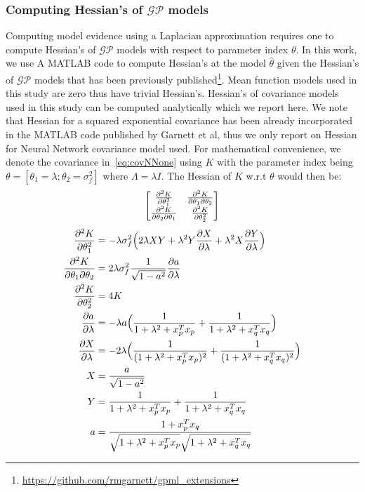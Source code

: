 \subsubsection{Computing Hessian's of $\mathcal{GP}$ models}
Computing model evidence using a Laplacian approximation requires one to compute Hessian's of $\mathcal{GP}$ models with respect to parameter index $\theta$. 
In this work, we use A MATLAB code to compute Hessian's at the model $\hat{\theta}$ given the Hessian's of $\mathcal{GP}$ models that has been previously published\footnote{\url{https://github.com/rmgarnett/gpml_extensions}}. Mean function models used in this study are zero thus have trivial Hessian's. Hessian's of  covariance models used in this study can be computed analytically which we report here. We note that Hessian for a squared exponential covariance has been already incorporated in the MATLAB code published by Garnett et al, thus we only report on Hessian for Neural Network covariance model used. For mathematical convenience, we denote the covariance in~\cref{eq:covNNone} using $K$ with the parameter index being \(\theta=[\theta_1=\lambda ; \theta_2=\sigma_f^{2} ]\) where \( \Lambda=\lambda I\). The Hessian of $K$ w.r.t $\theta$ would then be:
\[
\begin{bmatrix} 
\pdv[2]{K}{\theta_1} & \pdv{K}{\theta_1}{\theta_2} \\
\pdv{K}{\theta_2}{\theta_1} & \pdv[2]{K}{\theta_2} 
\end{bmatrix}
\]
\begin{align*}
    \pdv[2]{K}{\theta_1} & = -\lambda \sigma_{f}^{2}\Big(2\lambda XY + \lambda^2 Y\pdv{X}{\lambda} + \lambda^2 X\pdv{Y}{\lambda} \Big) \\
    \pdv{K}{\theta_1}{\theta_2} & = 2\lambda \sigma_{f}^{2}\frac{1}{\sqrt{1-a^2}}\pdv{a}{\lambda} \\
    \pdv[2]{K}{\theta_2} & =4K \\
    \newline
    \pdv{a}{\lambda}(x_p,x_q) & = -\lambda a\Big( \frac{1}{1+\lambda^{2}+x^{T}_{p} x_{p}} + \frac{1}{1+\lambda^{2}+x^{T}_q x_q}\Big) \\
    \pdv{X}{\lambda} & = -2\lambda\Big(\frac{1}{(1+\lambda^{2}+x^{T}_{p} x_{p})^2} + \frac{1}{(1+\lambda^{2}+x^{T}_q x_q)^2}\Big) \\
    X & = \frac{a}{\sqrt{1-a^2}} \\
    Y & = \frac{1}{1+\lambda^{2}+x^{T}_{p} x_{p}} + \frac{1}{1+\lambda^{2}+x^{T}_q x_q} \\
    a & = \frac{1+x^{T}_px_q}{\sqrt{1+\lambda^{2}+x^{T}_{p} x_{p}}\sqrt{1+\lambda^{2}+x^{T}_q x_q}} \\
\end{align*}

